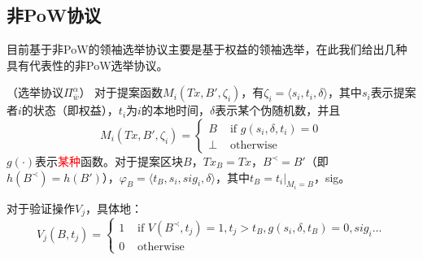 

\subsection{非PoW协议}
目前基于非PoW的领袖选举协议主要是基于权益的领袖选举，在此我们给出几种具有代表性的非PoW选举协议。

\begin{definition}
（选举协议$\Pi_{\bar{w}}^\alpha$） 对于提案函数$M_i(Tx,B',\zeta_i)$，有$\zeta_i=\langle s_i,t_i,\delta \rangle$，其中$s_i$表示提案者$i$的状态（即权益），$t_i$为$i$的本地时间，$\delta$表示某个伪随机数，并且
\begin{equation}
\label{eq:pos}
M_i(Tx,B',\zeta_i)=\begin{cases}
B & \text{ if } g(s_i,\delta,t_i)=0 \\ 
\bot & \text{ otherwise}
\end{cases}
\end{equation}
$g(\cdot)$表示\textcolor{red}{某种}函数。对于提案区块$B$，$Tx_B=Tx$，$B^{\prec}=B'$（即$h(B^\prec)=h(B')$），$\varphi_B=\langle t_B,s_i,sig_i,\delta\rangle$，其中$t_B=t_i|_{M_i=B}$，sig。

对于验证操作$V_j$，具体地：
\begin{equation}
\label{eq:pos_validation}
 V_j(B,t_j)=\begin{cases}
1 & \text{ if } V({B^\prec},t_j)=1,t_j>t_B,g(s_i,\delta,t_B)=0,sig_i... \\ 
0 & \text{ otherwise}
\end{cases}
\end{equation}
\end{definition}


